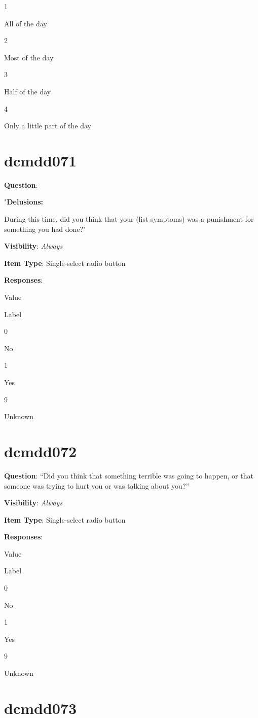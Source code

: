 \documentclass[]{book}
\begin{document}
1

All of the day

2

Most of the day

3

Half of the day

4

Only a little part of the day

\hypertarget{dcmdd071}{%
\section{dcmdd071}\label{dcmdd071}}

\textbf{Question}:

"\textbf{Delusions:}

During this time, did you think that your (list symptoms) was a punishment for something you had done?"

\textbf{Visibility}: \emph{Always}

\textbf{Item Type}: Single-select radio button

\textbf{Responses}:

Value

Label

0

No

1

Yes

9

Unknown

\hypertarget{dcmdd072}{%
\section{dcmdd072}\label{dcmdd072}}

\textbf{Question}: ``Did you think that something terrible was going to happen, or that someone was trying to hurt you or was talking about you?''

\textbf{Visibility}: \emph{Always}

\textbf{Item Type}: Single-select radio button

\textbf{Responses}:

Value

Label

0

No

1

Yes

9

Unknown

\hypertarget{dcmdd073}{%
\section{dcmdd073}\label{dcmdd073}}
\end{document}
